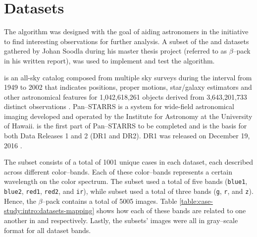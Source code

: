 \section{Datasets} \label{sect:meth:datasets}


The \mlblink algorithm was designed with the goal of aiding astronomers in the \vasco initiative to find interesting observations for further analysis. A subset of the \usno and \panstarrs datasets gathered by Johan Soodla during his master thesis project (referred to as $\beta$--pack in his written report), was used to implement and test the algorithm. \newline

\usno is an all-sky catalog composed from multiple sky surveys during the interval from 1949 to 2002 \cite{web:caltech:usno} that indicates positions, proper motions, star/galaxy estimators and other astronomical features for 1,042,618,261 objects derived from 3,643,201,733 distinct observations \cite{web:ap-i:usno}. Pan--STARRS is a system for wide-field astronomical imaging developed and operated by the Institute for Astronomy at the University of Hawaii. \panstarrs is the first part of Pan--STARRS to be completed and is the basis for both Data Releases 1 and 2 (DR1 and DR2). \panstarrs DR1 was released on December 19, 2016 \cite{web:stsci:panstarrs}.  \newline

The subset consists of a total of 1001 unique cases in each dataset, each described across different color--bands. Each of these color--bands represents a certain wavelength on the color spectrum. The \usno subset used a total of five bands (\texttt{blue1}, \texttt{blue2}, \texttt{red1}, \texttt{red2}, and \texttt{ir}), while \panstarrs subset used a total of three bands (\texttt{g}, \texttt{r}, and \texttt{z}). Hence, the $\beta$--pack contains a total of 5005 images. Table \ref{table:case-study:intro:datasets-mapping} shows how each of these bands are related to one another in \usno and \panstarrs respectively. Lastly, the subsets' images were all in gray--scale format for all dataset bands. 

